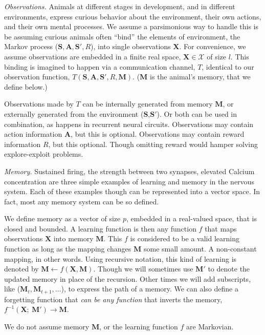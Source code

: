 \emph{Observations.} Animals at different stages in development, and in different environments, express curious behavior about the environment, their own actions, and their own mental processes. We assume a parsimonious way to handle this is be assuming curious animals often ``bind'' \cite{Robertson2003} the elements of environment, the Markov process ($\mathbf{S},\mathbf{A},\mathbf{S'},R$), into single observations $\mathbf{X}$. For convenience, we assume observations are embedded in a finite real space, $\mathbf{X} \in \mathcal{X}$ of size $l$. This binding is imagined to happen via a communication channel, $T$, identical to our observation function, $T(\mathbf{S},\mathbf{A},\mathbf{S'},R,\mathbf{M})$. ($\mathbf{M}$ is the animal's memory, that we define below.)

Observations made by $T$ can be internally generated from memory $\mathbf{M}$, or externally generated from the environment ($\mathbf{S}$,$\mathbf{S'}$). Or both can be used in combination, as happens in recurrent neural circuits. Observations may contain action information $\mathbf{A}$, but this is optional. Observations may contain reward information $R$, but this optional. Though omitting reward would hamper solving explore-exploit problems. 

\emph{Memory.} Sustained firing, the strength between two synapses, elevated Calcium concentration are three simple examples of learning and memory in the nervous system. Each of these examples though can be represented into a vector space. In fact, most any memory system can be so defined. 

We define memory as a vector of size $p$, embedded in a real-valued space, that is closed and bounded. A learning function is then any function $f$ that maps observations $\mathbf{X}$ into memory $\mathbf{M}$. This $f$ is considered to be a valid learning function as long as the mapping changes $\mathbf{M}$ some small amount. A non-constant mapping, in other words. Using recursive notation, this kind of learning is denoted by $\mathbf{M} \leftarrow f(\mathbf{X},\mathbf{M}) $. Though we will sometimes use $\mathbf{M'}$ to denote the updated memory in place of the recursion. Other times we will add subscripts, like ($\mathbf{M}_t,\mathbf{M}_{t+1},\ldots$), to express the path of a memory. We can also define a forgetting function that \textit{can be any function} that inverts the memory, $f^{-1}(\mathbf{X};\ \mathbf{M}') \rightarrow \mathbf{M}$. 

We do not assume memory $\mathbf{M}$, or the learning function $f$ are Markovian.

